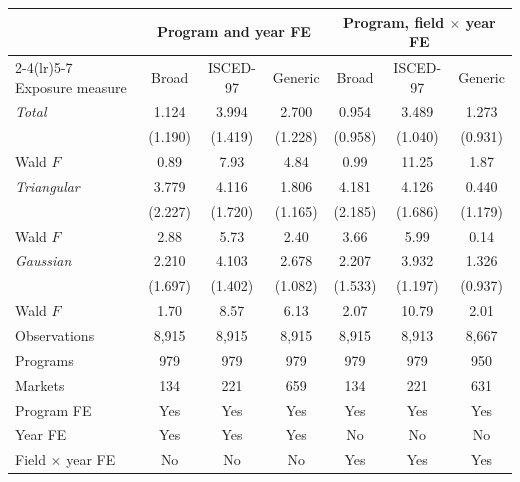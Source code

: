 \begin{tabular}{lcccccc}
\toprule
 & \multicolumn{3}{c}{Program and year FE} & \multicolumn{3}{c}{Program, field \(\times\) year FE} \\
\cmidrule(lr){2-4}\cmidrule(lr){5-7}
Exposure measure & Broad & ISCED-97 & Generic & Broad & ISCED-97 & Generic \\
\midrule
\textit{Total} &  1.124 &  3.994\sym{***} &  2.700\sym{**} &  0.954 &  3.489\sym{***} &  1.273 \\
 & (1.190) & (1.419) & (1.228) & (0.958) & (1.040) & (0.931) \\
\quad Wald \(F\) &  0.89 &  7.93 &  4.84 &  0.99 & 11.25 &  1.87 \\
\addlinespace
\textit{Triangular} &  3.779\sym{*} &  4.116\sym{**} &  1.806 &  4.181\sym{*} &  4.126\sym{**} &  0.440 \\
 & (2.227) & (1.720) & (1.165) & (2.185) & (1.686) & (1.179) \\
\quad Wald \(F\) &  2.88 &  5.73 &  2.40 &  3.66 &  5.99 &  0.14 \\
\addlinespace
\textit{Gaussian} &  2.210 &  4.103\sym{***} &  2.678\sym{**} &  2.207 &  3.932\sym{***} &  1.326 \\
 & (1.697) & (1.402) & (1.082) & (1.533) & (1.197) & (0.937) \\
\quad Wald \(F\) &  1.70 &  8.57 &  6.13 &  2.07 & 10.79 &  2.01 \\
\midrule
Observations &     8,915 &     8,915 &     8,915 &     8,915 &     8,913 &     8,667 \\
Programs &       979 &       979 &       979 &       979 &       979 &       950 \\
Markets &       134 &       221 &       659 &       134 &       221 &       631 \\
Program FE & Yes & Yes & Yes & Yes & Yes & Yes \\
Year FE & Yes & Yes & Yes & No & No & No \\
Field \(\times\) year FE & No & No & No & Yes & Yes & Yes \\
\bottomrule
\end{tabular}
